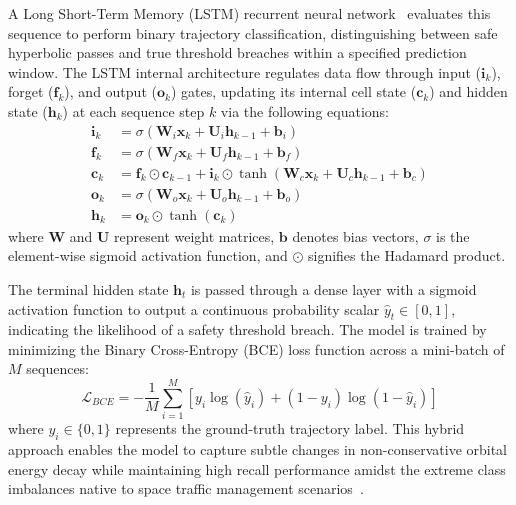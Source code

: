 \documentclass[letterpaper, preprint, 11pt]{AAS}
\begin{document}
A Long Short-Term Memory (LSTM) recurrent neural network~\cite{hochreiter_long_1997} evaluates this sequence to perform binary trajectory classification, distinguishing between safe hyperbolic passes and true threshold breaches within a specified prediction window. The LSTM internal architecture regulates data flow through input ($\mathbf{i}_k$), forget ($\mathbf{f}_k$), and output ($\mathbf{o}_k$) gates, updating its internal cell state ($\mathbf{c}_k$) and hidden state ($\mathbf{h}_k$) at each sequence step $k$ via the following equations:
\begin{align}
    \mathbf{i}_k &= \sigma\left( \mathbf{W}_i \mathbf{x}_k + \mathbf{U}_i \mathbf{h}_{k-1} + \mathbf{b}_i \right) \\
    \mathbf{f}_k &= \sigma\left( \mathbf{W}_f \mathbf{x}_k + \mathbf{U}_f \mathbf{h}_{k-1} + \mathbf{b}_f \right) \\
    \mathbf{c}_k &= \mathbf{f}_k \odot \mathbf{c}_{k-1} + \mathbf{i}_k \odot \tanh\left( \mathbf{W}_c \mathbf{x}_k + \mathbf{U}_c \mathbf{h}_{k-1} + \mathbf{b}_c \right) \\
    \mathbf{o}_k &= \sigma\left( \mathbf{W}_o \mathbf{x}_k + \mathbf{U}_o \mathbf{h}_{k-1} + \mathbf{b}_o \right) \\
    \mathbf{h}_k &= \mathbf{o}_k \odot \tanh\left( \mathbf{c}_k \right)
\end{align}
where $\mathbf{W}$ and $\mathbf{U}$ represent weight matrices, $\mathbf{b}$ denotes bias vectors, $\sigma$ is the element-wise sigmoid activation function, and $\odot$ signifies the Hadamard product.

The terminal hidden state $\mathbf{h}_t$ is passed through a dense layer with a sigmoid activation function to output a continuous probability scalar $\hat{y}_t \in [0, 1]$, indicating the likelihood of a safety threshold breach. The model is trained by minimizing the Binary Cross-Entropy (BCE) loss function across a mini-batch of $M$ sequences:
\begin{equation}
    \mathcal{L}_{BCE} = -\frac{1}{M} \sum_{i=1}^{M} \left[ y_i \log(\hat{y}_i) + (1 - y_i) \log(1 - \hat{y}_i) \right]
    \label{eq:bce_loss}
\end{equation}
where $y_i \in \{0, 1\}$ represents the ground-truth trajectory label. This hybrid approach enables the model to capture subtle changes in non-conservative orbital energy decay while maintaining high recall performance amidst the extreme class imbalances native to space traffic management scenarios~\cite{sanchez-ortiz_automated_2022}.
\end{document}
